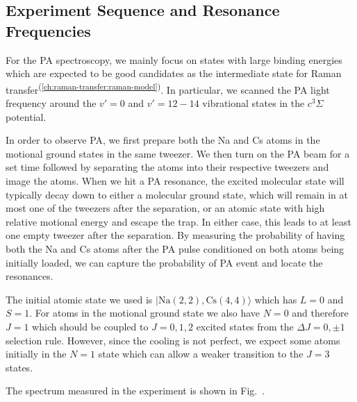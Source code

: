 \subsection{Experiment Sequence and Resonance Frequencies}
\label{pa:sequence-res}

For the PA spectroscopy, we mainly focus on states with large binding energies
which are expected to be good candidates as the intermediate state
for Raman transfer\textsuperscript{(\ref{ch:raman-transfer:raman-model})}.
In particular, we scanned the PA light frequency around the $v'=0$ and $v'=12-14$
vibrational states in the $c^3\Sigma$ potential.

In order to observe PA, we first prepare both the Na and Cs atoms in the motional ground states
in the same tweezer\cite{liu_building_2018}.
We then turn on the PA beam for a set time
followed by separating the atoms into their respective tweezers and image the atoms.
When we hit a PA resonance, the excited molecular state will typically decay down
to either a molecular ground state,
which will remain in at most one of the tweezers after the separation,
or an atomic state with high relative motional energy and escape the trap.
In either case, this leads to at least one empty tweezer after the separation.
By measuring the probability of having both the Na and Cs atoms after the PA pulse
conditioned on both atoms being initially loaded,
we can capture the probability of PA event and locate the resonances.

The initial atomic state we used is $|\mathrm{Na(2, 2),Cs(4, 4)}\rangle$
which has $L=0$ and $S=1$.
For atoms in the motional ground state we also have $N=0$ and therefore $J=1$
which should be coupled to $J=0,1,2$ excited states from the $\Delta J=0,\pm1$ selection rule.
However, since the cooling is not perfect,
we expect some atoms initially in the $N=1$ state which can allow a weaker
transition to the $J=3$ states.

The spectrum measured in the experiment is shown in Fig.~\todo{\ref{}}.



